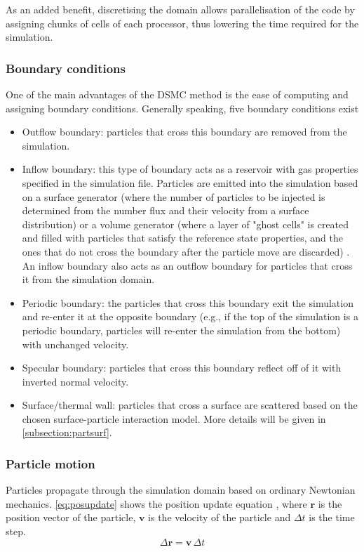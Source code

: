 As an added benefit, discretising the domain allows parallelisation of the code by assigning chunks of cells of each processor, thus lowering the time required for the simulation.

\subsubsection{Boundary conditions}
One of the main advantages of the DSMC method is the ease of computing and assigning boundary conditions. Generally speaking, five boundary conditions exist \cite{natodsmc, spartadoc}
\begin{itemize}
    \item Outflow boundary: particles that cross this boundary are removed from the simulation.
    \item Inflow boundary: this type of boundary acts as a reservoir with gas properties specified in the simulation file. Particles are emitted into the simulation based on a surface generator (where the number of particles to be injected is determined from the number flux and their velocity from a surface distribution) or a volume generator (where a layer of "ghost cells" is created and filled with particles that satisfy the reference state properties, and the ones that do not cross the boundary after the particle move are discarded) \cite{natodsmc}. An inflow boundary also acts as an outflow boundary for particles that cross it from the simulation domain.
    \item Periodic boundary: the particles that cross this boundary exit the simulation and re-enter it at the opposite boundary (e.g., if the top of the simulation is a periodic boundary, particles will re-enter the simulation from the bottom) with unchanged velocity.
    \item Specular boundary: particles that cross this boundary reflect off of it with inverted normal velocity.
    \item Surface/thermal wall: particles that cross a surface are scattered based on the chosen surface-particle interaction model. More details will be given in \autoref{subsection:partsurf}.
\end{itemize}

\subsubsection{Particle motion}
\label{subsection:motion}
Particles propagate through the simulation domain based on ordinary Newtonian mechanics. \autoref{eq:posupdate} shows the position update equation \cite{bird}, where $\mathbf{r}$ is the position vector of the particle, $\mathbf{v}$ is the velocity of the particle and $\Delta{t}$ is the time step.
\begin{equation}
    \Delta{\mathbf{r}} = \mathbf{v}\, \Delta{t}
    \label{eq:posupdate}
\end{equation}

